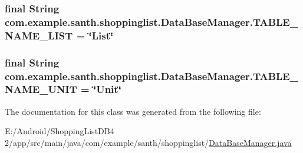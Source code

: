 \subsubsection[{\texorpdfstring{T\+A\+B\+L\+E\+\_\+\+N\+A\+M\+E\+\_\+\+L\+I\+ST}{TABLE_NAME_LIST}}]{\setlength{\rightskip}{0pt plus 5cm}final String com.\+example.\+santh.\+shoppinglist.\+Data\+Base\+Manager.\+T\+A\+B\+L\+E\+\_\+\+N\+A\+M\+E\+\_\+\+L\+I\+ST = \char`\"{}List\char`\"{}\hspace{0.3cm}{\ttfamily [static]}}\hypertarget{classcom_1_1example_1_1santh_1_1shoppinglist_1_1_data_base_manager_a4baaaa98454321bf218711bd5c716dfb}{}\label{classcom_1_1example_1_1santh_1_1shoppinglist_1_1_data_base_manager_a4baaaa98454321bf218711bd5c716dfb}
\subsubsection[{\texorpdfstring{T\+A\+B\+L\+E\+\_\+\+N\+A\+M\+E\+\_\+\+U\+N\+IT}{TABLE_NAME_UNIT}}]{\setlength{\rightskip}{0pt plus 5cm}final String com.\+example.\+santh.\+shoppinglist.\+Data\+Base\+Manager.\+T\+A\+B\+L\+E\+\_\+\+N\+A\+M\+E\+\_\+\+U\+N\+IT = \char`\"{}Unit\char`\"{}\hspace{0.3cm}{\ttfamily [static]}}\hypertarget{classcom_1_1example_1_1santh_1_1shoppinglist_1_1_data_base_manager_a6001c0b58adbe34cf48abe6c06ee2704}{}\label{classcom_1_1example_1_1santh_1_1shoppinglist_1_1_data_base_manager_a6001c0b58adbe34cf48abe6c06ee2704}


The documentation for this class was generated from the following file\+:\begin{DoxyCompactItemize}
\item 
E\+:/\+Android/\+Shopping\+List\+D\+B4 2/app/src/main/java/com/example/santh/shoppinglist/\hyperlink{_data_base_manager_8java}{Data\+Base\+Manager.\+java}\end{DoxyCompactItemize}
